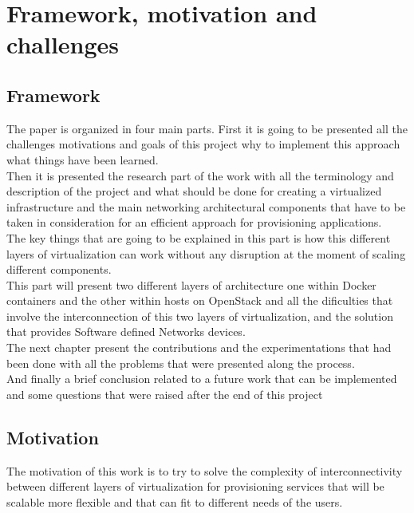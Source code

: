 \chapter{Framework, motivation and challenges} %

\label{ch:framework, motivation and challenges}

\section{Framework}

The paper is organized in four main parts. First it is going to be presented all the challenges motivations and goals of this project why to implement this approach what things have been learned.\\
 
Then it is presented the research part of the work with all the terminology and description of the project and what should be done for creating a virtualized infrastructure and the main networking architectural components that have to be taken in consideration for an efficient approach for provisioning applications.\\
 
The key things that are going to be explained in this part is how this different layers of virtualization can work without any disruption at the moment of scaling different components.\\

This part will present two different layers of architecture one within Docker containers and the other within hosts on OpenStack and all the dificulties that involve the interconnection of this two layers of virtualization, and the solution that provides Software defined Networks devices.\\
 
The next chapter present the contributions and the experimentations that had been done with all the problems that were presented along the process.\\
 
And finally a brief conclusion related to a future work that can be implemented and some questions that were raised after the end of this project\\
 
\section{Motivation} 

The motivation of this work is to try to solve the complexity of interconnectivity between different layers of virtualization for provisioning services that will be scalable more flexible and that can fit to different needs of the users.\\

